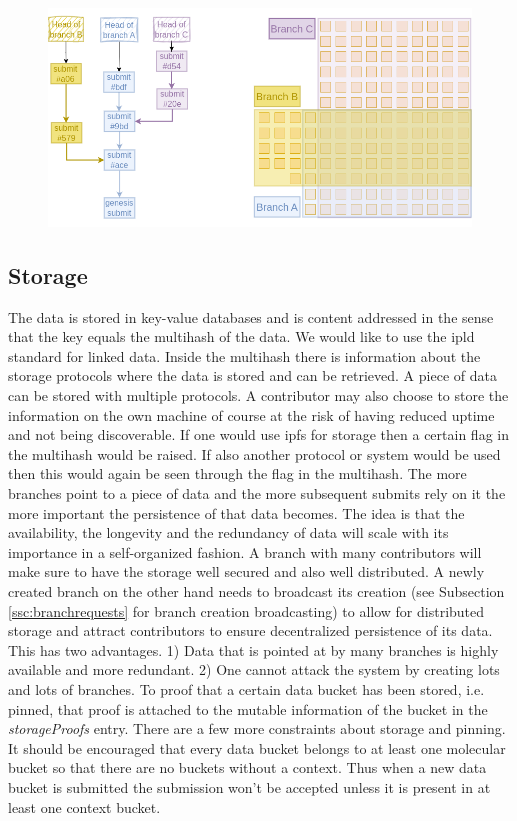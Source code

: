 \begin{figure}[b!]
  \begin{center}
    \includegraphics[width=1.0\textwidth]{src/img/BranchBucketRelationV2.png}
\end{center}
 \caption{}
 \label{fig:branchbucketrel}
\end{figure}

\subsection{Storage}
\label{ssc:storage}

The data is stored in key-value databases and is content addressed in the sense that the key equals the multihash of the data. We would like to use the ipld standard for linked data. Inside the multihash there is information about the storage protocols where the data is stored and can be retrieved. A piece of data can be stored with multiple protocols. A contributor may also choose to store the information on the own machine of course at the risk of having reduced uptime and not being discoverable. If one would use ipfs for storage then a certain flag in the multihash would be raised. If also another protocol or system would be used then this would again be seen through the flag in the multihash. The more branches point to a piece of data and the more subsequent submits rely on it the more important the persistence of that data becomes.   
The idea is that the availability, the longevity and the redundancy of data will scale with its importance in a self-organized fashion. A branch with many contributors will make sure to have the storage well secured and also well distributed. A newly created branch on the other hand needs to broadcast its creation (see Subsection \ref{ssc:branchrequests} for branch creation broadcasting) to allow for distributed storage  and attract contributors to ensure decentralized persistence of its data. 
This has two advantages. 1) Data that is pointed at by many branches is highly available and more redundant. 2) One cannot attack the system by creating lots and lots of branches. To proof that a certain data bucket has been stored, i.e. pinned, that proof is attached to the mutable information of the bucket in the \textit{storageProofs} entry. There are a few more constraints about storage and pinning. It should be encouraged that every data bucket belongs to at least one molecular bucket so that there are no buckets without a context. Thus when a new data bucket is submitted the submission won't be accepted unless it is present in at least one context bucket.

